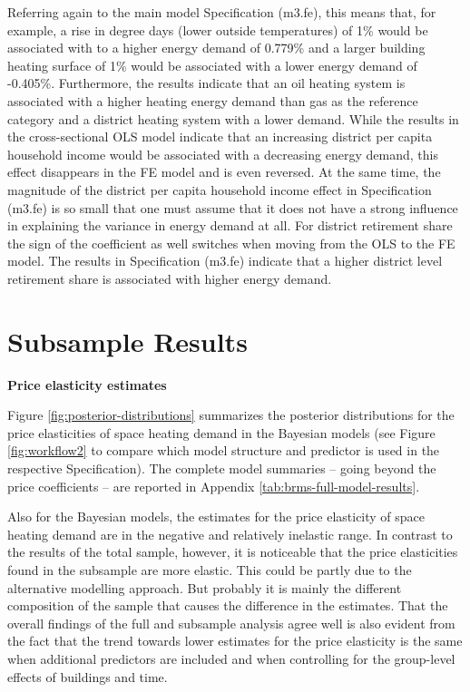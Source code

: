 \documentclass[12pt,twoside]{reedthesis}
\begin{document}
Referring again to the main model Specification (m3.fe), this means that, for example, a rise in degree days (lower outside temperatures) of 1\% would be associated with to a higher energy demand of 0.779\% and a larger building heating surface of 1\% would be associated with a lower energy demand of -0.405\%. Furthermore, the results indicate that an oil heating system is associated with a higher heating energy demand than gas as the reference category and a district heating system with a lower demand. While the results in the cross-sectional OLS model indicate that an increasing district per capita household income would be associated with a decreasing energy demand, this effect disappears in the FE model and is even reversed. At the same time, the magnitude of the district per capita household income effect in Specification (m3.fe) is so small that one must assume that it does not have a strong influence in explaining the variance in energy demand at all. For district retirement share the sign of the coefficient as well switches when moving from the OLS to the FE model. The results in Specification (m3.fe) indicate that a higher district level retirement share is associated with higher energy demand.

\hypertarget{subsample-results}{%
\section{Subsample Results}\label{subsample-results}}

\textbf{Price elasticity estimates}

Figure \ref{fig:posterior-distributions} summarizes the posterior distributions for the price elasticities of space heating demand in the Bayesian models (see Figure \ref{fig:workflow2} to compare which model structure and predictor is used in the respective Specification). The complete model summaries -- going beyond the price coefficients -- are reported in Appendix \ref{tab:brms-full-model-results}.

Also for the Bayesian models, the estimates for the price elasticity of space heating demand are in the negative and relatively inelastic range. In contrast to the results of the total sample, however, it is noticeable that the price elasticities found in the subsample are more elastic. This could be partly due to the alternative modelling approach. But probably it is mainly the different composition of the sample that causes the difference in the estimates. That the overall findings of the full and subsample analysis agree well is also evident from the fact that the trend towards lower estimates for the price elasticity is the same when additional predictors are included and when controlling for the group-level effects of buildings and time.
\end{document}
